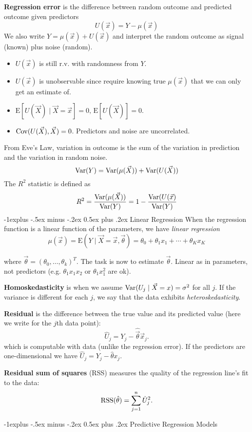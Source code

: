 \documentclass[10pt,landscape]{article}
\makeatletter
\renewcommand{\subsection}{\@startsection{subsection}{2}{0mm}%
                                {-1explus -.5ex minus -.2ex}%
                                {0.5ex plus .2ex}%
                                {\normalfont\normalsize\bfseries}}
\newcommand{\E}{\text{E}}
\makeatother
\begin{document}
\begin{multicols*}{3}
\textbf{Regression error} is the difference between random outcome and predicted outcome given predictors
$$
U(\vec{x})=Y-\mu(\vec{x})
$$
We also write $Y=\mu(\vec{x})+U(\vec{x})$ and interpret the random outcome as signal (known) plus noise (random).
\begin{itemize}
    \item $U(\vec{x})$ is still r.v. with randomness from $Y$.
    \item $U(\vec{x})$ is unobservable since require knowing true $\mu(\vec{x})$ that we can only get an estimate of.
    \item $\E[U(\vec{X})\mid\vec{X}=\vec{x}]=0,\,\E[U(\vec{X})]=0$.
    \item $\operatorname{Cov}(U(\vec{X}),\vec{X})=0$. Predictors and noise are uncorrelated.
\end{itemize}
From Eve's Law, variation in outcome is the sum of the variation in prediction and the variation in random noise.
$$
\operatorname{Var}(Y)=\operatorname{Var}(\mu(\vec{X}))+\operatorname{Var}(U(\vec{X}))
$$
The $R^2$ statistic is defined as
$$
R^2=\frac{\operatorname{Var}(\mu(\vec{X}))}{\operatorname{Var}(Y)}=1-\frac{\operatorname{Var}(U(\vec{x})}{\operatorname{Var}(Y)}
$$
\subsection{Linear Regression}
When the regression function is a linear function of the parameters, we have \emph{linear regression}
$$\mu(\vec{x})=\E (Y\mid \vec{X}=\vec{x},\vec{\theta})=\theta_0+\theta_1x_1+\cdots+\theta_K x_K$$

where $\vec{\theta}=(\theta_0,\ldots,\theta_k)^T$. The task is now to estimate $\vec{\theta}$. Linear as in parameters, not predictors (e.g. $\theta_1 x_1 x_2$ or $\theta_1 x_1^2$ are ok).

\textbf{Homoskedasticity} is when we assume $\operatorname{Var} (U_j\mid \vec{X}={x})=\sigma^2$ for all $j$. If the variance is different for each $j$, we say that the data exhibits \emph{heteroskedasticity}.

\textbf{Residual} is the difference between the true value and its predicted value (here we write for the $j$th data point):
$$\hat{U}_j=Y_j-\hat{\vec\theta}\vec x_j.$$
which is computable with data (unlike the regression error). If the predictors are one-dimensional we have $\hat{U}_j=Y_j-\hat{\theta} x_j.$

\textbf{Residual sum of squares} (RSS) measures the quality of the regression line's fit to the data:$$\operatorname{RSS}(\hat{\theta})=\sum_{j=1}^n \hat{U}_j^2.$$

\subsection{Predictive Regression Models}


\end{multicols*}
\end{document}
